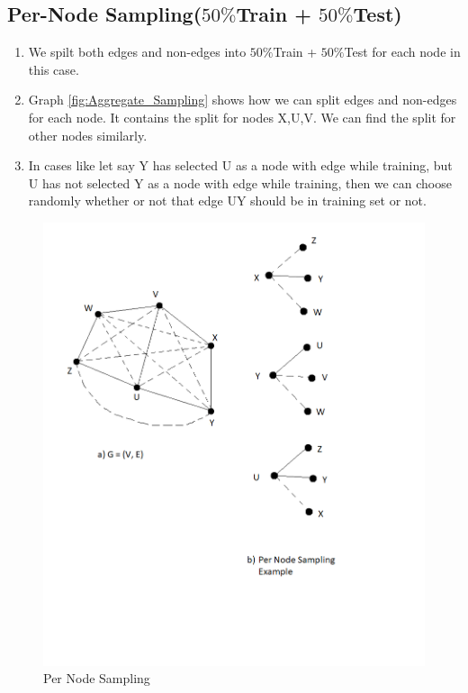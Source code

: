 \documentclass{article}
\begin{document}
\subsection{Per-Node Sampling($50\%$Train + $50\%$Test)}
\begin{enumerate}
    \item We spilt both edges and non-edges into $50\%$Train + $50\%$Test for each node in this case.
    \item Graph \ref{fig:Aggregate_Sampling} shows how we can split edges and non-edges for each node. It contains the split for nodes X,U,V. We can find the split for other nodes similarly.
    \item In cases like let say Y has selected U as a node with edge while training, but U has not selected Y as a node with edge while training, then we can choose randomly whether or not that edge UY should be in training set or not.
\end{enumerate}
\begin{figure}[h!]
    \centering
    \includegraphics[width=0.7\linewidth]{per_node.png}
    \caption{Per Node Sampling}
    \label{fig:per_node}
\end{figure}
\end{document}
